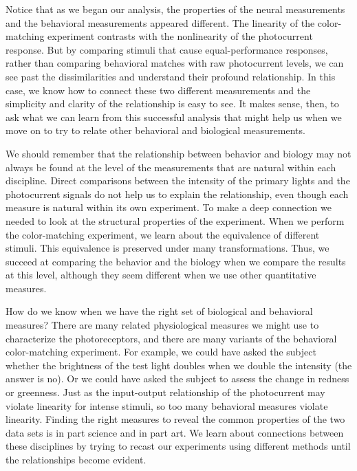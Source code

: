 Notice that as we began our analysis,
the properties of the neural measurements and the
behavioral measurements appeared different.
The linearity of the color-matching experiment contrasts
with the nonlinearity of the photocurrent response.
But by comparing stimuli that cause equal-performance responses, 
rather than comparing behavioral matches
with raw photocurrent levels,
we can see past the dissimilarities and understand
their profound relationship.
In this case, we know how to connect these two
different measurements and the simplicity and clarity
of the relationship is easy to see.
It makes sense, then, to ask what we can learn from
this successful analysis that might help us when
we move on to try to relate other
behavioral and biological measurements.

We should remember that the relationship
between behavior and biology may not always
be found at the level of the measurements that
are natural within each discipline.
Direct comparisons between the intensity of the
primary lights and the photocurrent signals do not
help us to explain the relationship, even though each
measure is natural within its own experiment.
To make a deep connection we needed to look at the
structural properties of the experiment.
When we perform the color-matching experiment,
we learn about the equivalence of different stimuli.
This equivalence is preserved
under many transformations.
Thus, we succeed at comparing the behavior and the
biology when we compare the results at this
level, although they seem different when we use
other quantitative measures.

How do we know when we have the right set of biological
and behavioral measures?
There are many related physiological measures
we might use to characterize the photoreceptors,
and there are many variants
of the behavioral color-matching experiment.
For example, we could have asked the subject whether the
brightness of the test light doubles when we double
the intensity (the answer is no).
Or we could have asked the subject to assess the change
in redness or greenness.
Just as the input-output relationship of the photocurrent
may violate linearity for intense stimuli,
so too many behavioral measures violate linearity.
Finding the right measures to reveal the common properties
of the two data sets is in part science and in part art.
We learn about connections between
these disciplines by trying to recast our experiments
using different methods until the relationships become evident.

